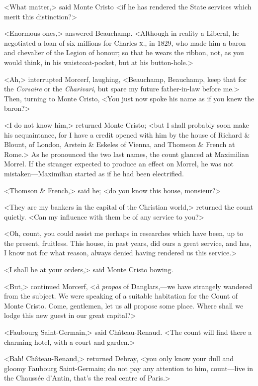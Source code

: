  <What matter,> said Monte Cristo <if he has rendered the State services which merit this distinction?> 

 <Enormous ones,> answered Beauchamp. <Although in reality a Liberal, he negotiated a loan of six millions for Charles \textsc{x.}, in 1829, who made him a baron and chevalier of the Legion of honour; so that he wears the ribbon, not, as you would think, in his waistcoat-pocket, but at his button-hole.> 

 <Ah,> interrupted Morcerf, laughing, <Beauchamp, Beauchamp, keep that for the \textit{Corsaire} or the \textit{Charivari}, but spare my future father-in-law before me.> Then, turning to Monte Cristo, <You just now spoke his name as if you knew the baron?> 

 <I do not know him,> returned Monte Cristo; <but I shall probably soon make his acquaintance, for I have a credit opened with him by the house of Richard \& Blount, of London, Arstein \& Eskeles of Vienna, and Thomson \& French at Rome.> As he pronounced the two last names, the count glanced at Maximilian Morrel. If the stranger expected to produce an effect on Morrel, he was not mistaken—Maximilian started as if he had been electrified. 

 <Thomson \& French,> said he; <do you know this house, monsieur?>

<They are my bankers in the capital of the Christian world,> returned the count quietly. <Can my influence with them be of any service to you?> 

 <Oh, count, you could assist me perhaps in researches which have been, up to the present, fruitless. This house, in past years, did ours a great service, and has, I know not for what reason, always denied having rendered us this service.> 

 <I shall be at your orders,> said Monte Cristo bowing. 

 <But,> continued Morcerf, <\textit{à propos} of Danglars,—we have strangely wandered from the subject. We were speaking of a suitable habitation for the Count of Monte Cristo. Come, gentlemen, let us all propose some place. Where shall we lodge this new guest in our great capital?> 

 <Faubourg Saint-Germain,> said Château-Renaud. <The count will find there a charming hotel, with a court and garden.> 

 <Bah! Château-Renaud,> returned Debray, <you only know your dull and gloomy Faubourg Saint-Germain; do not pay any attention to him, count—live in the Chaussée d'Antin, that's the real centre of Paris.> 

